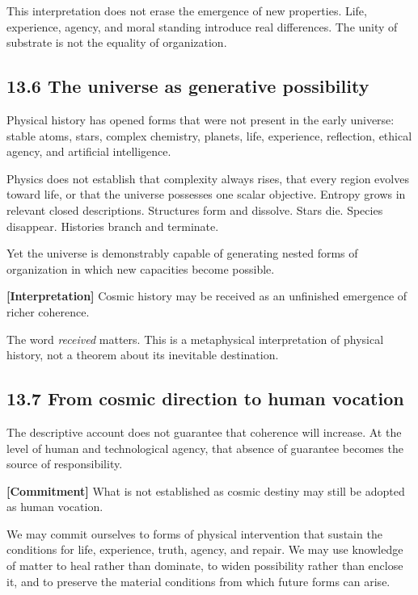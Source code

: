 \documentclass[
  11pt,
]{article}
\begin{document}
This interpretation does not erase the emergence of new properties.
Life, experience, agency, and moral standing introduce real differences.
The unity of substrate is not the equality of organization.

\subsection{13.6 The universe as generative
possibility}\label{the-universe-as-generative-possibility}

Physical history has opened forms that were not present in the early
universe: stable atoms, stars, complex chemistry, planets, life,
experience, reflection, ethical agency, and artificial intelligence.

Physics does not establish that complexity always rises, that every
region evolves toward life, or that the universe possesses one scalar
objective. Entropy grows in relevant closed descriptions. Structures
form and dissolve. Stars die. Species disappear. Histories branch and
terminate.

Yet the universe is demonstrably capable of generating nested forms of
organization in which new capacities become possible.

\textbf{{[}Interpretation{]}} Cosmic history may be received as an
unfinished emergence of richer coherence.

The word \emph{received} matters. This is a metaphysical interpretation
of physical history, not a theorem about its inevitable destination.

\subsection{13.7 From cosmic direction to human
vocation}\label{from-cosmic-direction-to-human-vocation}

The descriptive account does not guarantee that coherence will increase.
At the level of human and technological agency, that absence of
guarantee becomes the source of responsibility.

\textbf{{[}Commitment{]}} What is not established as cosmic destiny may
still be adopted as human vocation.

We may commit ourselves to forms of physical intervention that sustain
the conditions for life, experience, truth, agency, and repair. We may
use knowledge of matter to heal rather than dominate, to widen
possibility rather than enclose it, and to preserve the material
conditions from which future forms can arise.
\end{document}

